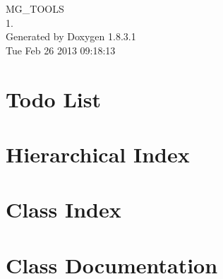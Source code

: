 \documentclass{book}
\begin{document}
\hypersetup{pageanchor=false,citecolor=blue}
\begin{titlepage}
\vspace*{7cm}
\begin{center}
{\Large M\-G\-\_\-\-T\-O\-O\-L\-S \\[1ex]\large 1. }\\
\vspace*{1cm}
{\large Generated by Doxygen 1.8.3.1}\\
\vspace*{0.5cm}
{\small Tue Feb 26 2013 09:18:13}\\
\end{center}
\end{titlepage}
\clearemptydoublepage
{}
\tableofcontents
\clearemptydoublepage
{}
\hypersetup{pageanchor=true,citecolor=blue}
\chapter{Todo List}
\label{todo}
\hypertarget{todo}{}

\chapter{Hierarchical Index}

\chapter{Class Index}

\chapter{Class Documentation}














\printindex
\end{document}
